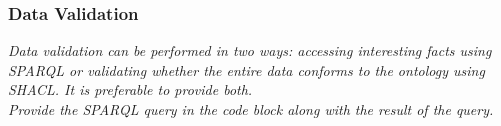 \subsubsection*{Data Validation}
 \textit{ 
Data validation can be performed in two ways: accessing interesting facts using SPARQL or validating whether the entire data conforms to the ontology using SHACL. It is preferable to provide both. \\
Provide the SPARQL query in the code block along with the result of the query. \\
  }